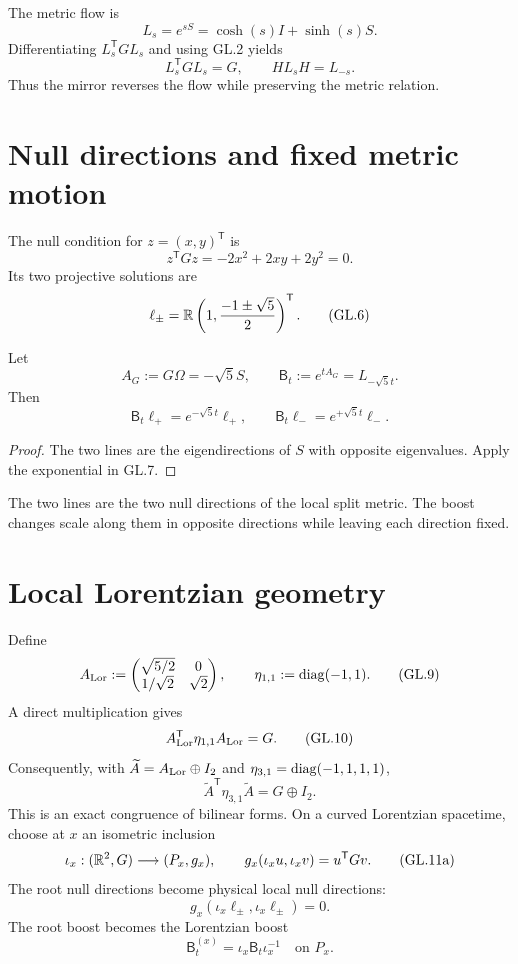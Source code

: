 \documentclass[10pt]{article}
\begin{document}
The metric flow is
\[
L_s=e^{sS}=\cosh(s)I+\sinh(s)S.
\tag{GL.3}
\]
Differentiating $L_s^{\mathsf T}GL_s$ and using GL.2 yields
\[
L_s^{\mathsf T}GL_s=G,\qquad
HL_sH=L_{-s}.
\tag{GL.4}
\]
Thus the mirror reverses the flow while preserving the metric relation.

\section{Null directions and fixed metric motion}

The null condition for $z=(x,y)^{\mathsf T}$ is
\[
z^{\mathsf T}Gz=-2x^2+2xy+2y^2=0.
\tag{GL.5}
\]
Its two projective solutions are
\[
\ell_\pm=\mathbb R\left(1,\frac{-1\pm\sqrt5}{2}\right)^{\mathsf T}.
\tag{GL.6}
\]

\begin{proposition}
Let
\[
A_G:=G\Omega=-\sqrt5S,\qquad
\mathsf B_t:=e^{tA_G}=L_{-\sqrt5t}.
\tag{GL.7}
\]
Then
\[
\mathsf B_t\ell_+=e^{-\sqrt5t}\ell_+,\qquad
\mathsf B_t\ell_-=e^{+\sqrt5t}\ell_-.
\tag{GL.8}
\]
\end{proposition}

\begin{proof}
The two lines are the eigendirections of $S$ with opposite eigenvalues. Apply
the exponential in GL.7.
\end{proof}

The two lines are the two null directions of the local split metric. The boost
changes scale along them in opposite directions while leaving each direction
fixed.

\section{Local Lorentzian geometry}

Define
\[
A_{\rm Lor}:=
\begin{pmatrix}
\sqrt{5/2}&0\\
1/\sqrt2&\sqrt2
\end{pmatrix},
\qquad
\eta_{1,1}:=\operatorname{diag}(-1,1).
\tag{GL.9}
\]
A direct multiplication gives
\[
A_{\rm Lor}^{\mathsf T}\eta_{1,1}A_{\rm Lor}=G.
\tag{GL.10}
\]
Consequently, with $\widetilde A=A_{\rm Lor}\oplus I_2$ and
$\eta_{3,1}=\operatorname{diag}(-1,1,1,1)$,
\[
\widetilde A^{\mathsf T}\eta_{3,1}\widetilde A=G\oplus I_2.
\tag{GL.11}
\]
This is an exact congruence of bilinear forms. On a curved Lorentzian
spacetime, choose at $x$ an isometric inclusion
\[
\iota_x:(\mathbb R^2,G)\longrightarrow(P_x,g_x),
\qquad
g_x(\iota_xu,\iota_xv)=u^{\mathsf T}Gv.
\tag{GL.11a}
\]
The root null directions become physical local null directions:
\[
g_x(\iota_x\ell_\pm,\iota_x\ell_\pm)=0.
\tag{GL.11b}
\]
The root boost becomes the Lorentzian boost
\[
\mathsf B_t^{(x)}=\iota_x\mathsf B_t\iota_x^{-1}
\quad\text{on }P_x.
\tag{GL.11c}
\]
\end{document}

